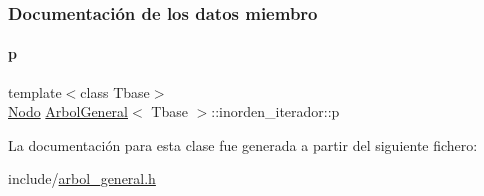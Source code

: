 \subsubsection{Documentación de los datos miembro}
\hypertarget{classArbolGeneral_1_1inorden__iterador_a77d9424a41cf406909fe131c11ccc856}{}\label{classArbolGeneral_1_1inorden__iterador_a77d9424a41cf406909fe131c11ccc856} 
\paragraph{\texorpdfstring{p}{p}}
{\footnotesize\ttfamily template$<$class Tbase$>$ \\
\hyperlink{classArbolGeneral_a12cc1b74a9095d89bc7334290d332f7a}{Nodo} \hyperlink{classArbolGeneral}{Arbol\+General}$<$ Tbase $>$\+::inorden\+\_\+iterador\+::p\hspace{0.3cm}{\ttfamily [private]}}



La documentación para esta clase fue generada a partir del siguiente fichero\+:\begin{DoxyCompactItemize}
\item 
include/\hyperlink{arbol__general_8h}{arbol\+\_\+general.\+h}\end{DoxyCompactItemize}
